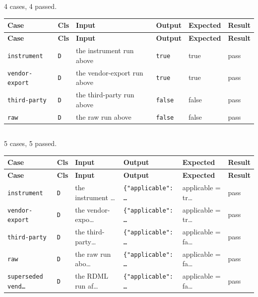 \subsection*{}
{\small 4 cases, 4 passed.}\par
{\small
\begin{xltabular}{\linewidth}{|X|l|l|l|l|l|}
\toprule \textbf{Case} & \textbf{Cls} & \textbf{Input} & \textbf{Output} & \textbf{Expected} & \textbf{Result} \\\midrule\endfirsthead
\toprule \textbf{Case} & \textbf{Cls} & \textbf{Input} & \textbf{Output} & \textbf{Expected} & \textbf{Result} \\\midrule\endhead
\texttt{instrument} & \texttt{D} & the instrument run above & \texttt{true} & true & pass \\
\texttt{vendor-export} & \texttt{D} & the vendor-export run above & \texttt{true} & true & pass \\
\texttt{third-party} & \texttt{D} & the third-party run above & \texttt{false} & false & pass \\
\texttt{raw} & \texttt{D} & the raw run above & \texttt{false} & false & pass \\
\bottomrule
\end{xltabular}}

\subsection*{}
{\small 5 cases, 5 passed.}\par
{\small
\begin{xltabular}{\linewidth}{|X|l|l|l|l|l|}
\toprule \textbf{Case} & \textbf{Cls} & \textbf{Input} & \textbf{Output} & \textbf{Expected} & \textbf{Result} \\\midrule\endfirsthead
\toprule \textbf{Case} & \textbf{Cls} & \textbf{Input} & \textbf{Output} & \textbf{Expected} & \textbf{Result} \\\midrule\endhead
\texttt{instrument} & \texttt{D} & the instrument … & \texttt{\{"applicable": …} & applicable = tr… & pass \\
\texttt{vendor-export} & \texttt{D} & the vendor-expo… & \texttt{\{"applicable": …} & applicable = tr… & pass \\
\texttt{third-party} & \texttt{D} & the third-party… & \texttt{\{"applicable": …} & applicable = fa… & pass \\
\texttt{raw} & \texttt{D} & the raw run abo… & \texttt{\{"applicable": …} & applicable = fa… & pass \\
\texttt{superseded vend…} & \texttt{D} & the RDML run af… & \texttt{\{"applicable": …} & applicable = fa… & pass \\
\bottomrule
\end{xltabular}}


